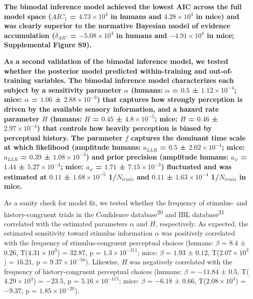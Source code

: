 \documentclass[
]{article}
\begin{document}
\textbf{The bimodal inference model achieved the lowest AIC across the
full model space (\(AIC_1\) = \(\ensuremath{4.73\times 10^{4}}\) in
humans and \(\ensuremath{4.28\times 10^{4}}\) in mice) and was clearly
superior to the normative Bayesian model of evidence accumulation
(\(\delta_{AIC}\) = \(\ensuremath{-5.08\times 10^{4}}\) in humans and
\(\ensuremath{-4.91\times 10^{4}}\) in mice; Supplemental Figure S9).}

\textbf{As a second validation of the bimodal inference model, we tested
whether the posterior model predicted within-training and
out-of-training variables. The bimodal inference model characterizes
each subject by a sensitivity parameter \(\alpha\) (humans: \(\alpha\) =
\(0.5\) ± \(\ensuremath{1.12\times 10^{-4}}\); mice: \(\alpha\) =
\(1.06\) ± \(\ensuremath{2.88\times 10^{-3}}\)) that captures how
strongly perception is driven by the available sensory information, and
a hazard rate parameter \(H\) (humans: \(H\) = \(0.45\) ±
\(\ensuremath{4.8\times 10^{-5}}\); mice: \(H\) = \(0.46\) ±
\(\ensuremath{2.97\times 10^{-4}}\)) that controls how heavily
perception is biased by perceptual history. The parameter \(f\) captures
the dominant time scale at which likelihood (amplitude humans:
\(a_{LLR}\) = \(0.5\) ± \(\ensuremath{2.02\times 10^{-4}}\); mice:
\(a_{LLR}\) = \(0.39\) ± \(\ensuremath{1.08\times 10^{-3}}\)) and prior
precision (amplitude humans: \(a_{\psi}\) = \(1.44\) ±
\(\ensuremath{5.27\times 10^{-4}}\); mice: \(a_{\psi}\) = \(1.71\) ±
\(\ensuremath{7.15\times 10^{-3}}\)) fluctuated and was estimated at
\(0.11\) ± \(\ensuremath{1.68\times 10^{-5}}\) 1/\(N_{trials}\) and
\(0.11\) ± \(\ensuremath{1.63\times 10^{-4}}\) 1/\(N_{trials}\) in
mice.}

As a sanity check for model fit, we tested whether the frequency of
stimulus- and history-congruent trials in the Confidence
database\textsuperscript{20} and IBL database\textsuperscript{21}
correlated with the estimated parameters \(\alpha\) and \(H\),
respectively. As expected, the estimated sensitivity toward stimulus
information \(\alpha\) was positively correlated with the frequency of
stimulus-congruent perceptual choices (humans: \(\beta\) = \(8.4\) ±
\(0.26\), T(\(\ensuremath{4.31\times 10^{3}}\)) = \(32.87\), p =
\(\ensuremath{1.3\times 10^{-211}}\); mice: \(\beta\) = \(1.93\) ±
\(0.12\), T(\(\ensuremath{2.07\times 10^{3}}\)) = \(16.21\), p =
\(\ensuremath{9.37\times 10^{-56}}\)). Likewise, \(H\) was negatively
correlated with the frequency of history-congruent perceptual choices
(humans: \(\beta\) = \(-11.84\) ± \(0.5\),
T(\(\ensuremath{4.29\times 10^{3}}\)) = \(-23.5\), p =
\(\ensuremath{5.16\times 10^{-115}}\); mice: \(\beta\) = \(-6.18\) ±
\(0.66\), T(\(\ensuremath{2.08\times 10^{3}}\)) = \(-9.37\), p =
\(\ensuremath{1.85\times 10^{-20}}\)).
\end{document}
